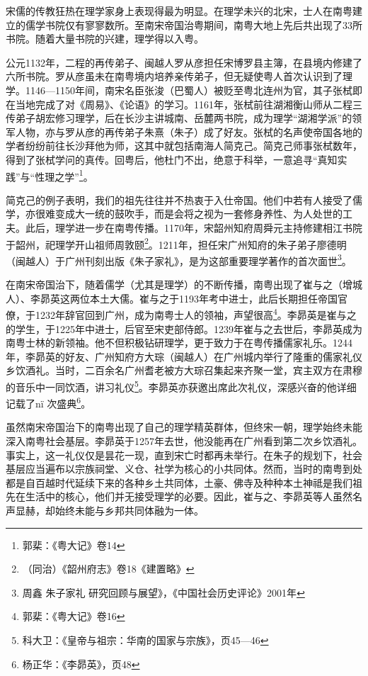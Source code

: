 宋儒的传教狂热在理学家身上表现得最为明显。在理学未兴的北宋，士人在南粤建立的儒学书院仅有寥寥数所。至南宋帝国治粤期间，南粤大地上先后共出现了33所书院。随着大量书院的兴建，理学得以入粤。

公元1132年，二程的再传弟子、闽越人罗从彦担任宋博罗县主簿，在县境内修建了六所书院。罗从彦虽未在南粤境内培养亲传弟子，但无疑使粤人首次认识到了理学。1146—1150年间，南宋名臣张浚（巴蜀人）被贬至粤北连州为官，其子张栻即在当地完成了对《周易》、《论语》的学习。1161年，张栻前往湖湘衡山师从二程三传弟子胡宏修习理学，后在长沙主讲城南、岳麓两书院，成为理学“湖湘学派”的领军人物，亦与罗从彦的再传弟子朱熹（朱子）成了好友。张栻的名声使帝国各地的学者纷纷前往长沙拜他为师，这其中就包括南海人简克己。简克己师事张栻数年，得到了张栻学问的真传。回粤后，他杜门不出，绝意于科举，一意追寻“真知实践”与“性理之学”\footnote{郭棐：《粤大记》卷14}。

简克己的例子表明，我们的祖先往往并不热衷于入仕帝国。他们中若有人接受了儒学，亦很难变成大一统的鼓吹手，而是会将之视为一套修身养性、为人处世的工夫。此后，理学进一步在南粤传播。1170年，宋韶州知府周舜元主持修建相江书院于韶州，祀理学开山祖师周敦颐\footnote{（同治）《韶州府志》卷18《建置略》}。1211年，担任宋广州知府的朱子弟子廖德明（闽越人）于广州刊刻出版《朱子家礼》，是为这部重要理学著作的首次面世\footnote{周鑫 朱子家礼 研究回顾与展望》，《中国社会历史评论》2001年}。

在南宋帝国治下，随着儒学（尤其是理学）的不断传播，南粤出现了崔与之（增城人）、李昴英这两位本土大儒。崔与之于1193年考中进士，此后长期担任帝国官僚，于1232年辞官回到广州，成为南粤士人的领袖，声望很高\footnote{郭棐：《粤大记》卷16}。李昴英是崔与之的学生，于1225年中进士，后官至宋吏部侍郎。1239年崔与之去世后，李昴英成为南粤士林的新领袖。他不但积极钻研理学，更于致力于在粤传播儒家礼乐。1244年，李昴英的好友、广州知府方大琮（闽越人）在广州城内举行了隆重的儒家礼仪乡饮酒礼。当时，二百余名广州耆老被方大琮召集起来齐聚一堂，宾主双方在肃穆的音乐中一同饮酒，讲习礼仪\footnote{科大卫：《皇帝与祖宗：华南的国家与宗族》，页45—46}。李昴英亦获邀出席此次礼仪，深感兴奋的他详细记载了nï 次盛典\footnote{杨正华：《李昴英》，页48}。

虽然南宋帝国治下的南粤出现了自己的理学精英群体，但终宋一朝，理学始终未能深入南粤社会基层。李昴英于1257年去世，他没能再在广州看到第二次乡饮酒礼。事实上，这一礼仪仅是昙花一现，直到宋亡时都再未举行。在朱子的规划下，社会基层应当遍布以宗族祠堂、义仓、社学为核心的小共同体。然而，当时的南粤到处都是自百越时代延续下来的各种乡土共同体，土豪、佛寺及种种本土神祗是我们祖先在生活中的核心，他们并无接受理学的必要。因此，崔与之、李昴英等人虽然名声显赫，却始终未能与乡邦共同体融为一体。

